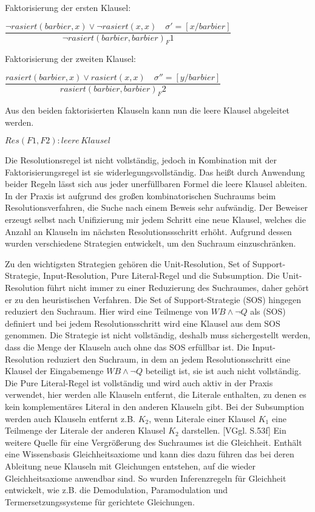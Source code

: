 Faktorisierung der ersten Klausel:\\
\begin{center}
$
\dfrac{\neg rasiert(barbier, x) \vee \neg rasiert(x, x) \quad \sigma' = [x/barbier]}{\neg rasiert(barbier, barbier)_F1}
$
\end{center}
Faktorisierung der zweiten Klausel:\\
\begin{center}
$
\dfrac{rasiert(barbier, x) \vee rasiert(x, x) \quad \sigma'' = [y/barbier]}{ rasiert(barbier, barbier)_F2}
$
\end{center}

Aus den beiden faktorisierten Klauseln kann nun die leere Klausel abgeleitet werden.
\begin{center}
$
Res(F1,F2) : leere\, Klausel
$
\end{center}
\cite[vgl. S.52]{GrundkursKI}

Die Resolutionsregel ist nicht vollständig, jedoch in Kombination mit der Faktorisierungsregel ist sie widerlegungsvollständig. Das heißt durch Anwendung beider Regeln lässt sich aus jeder unerfüllbaren Formel die leere Klausel ableiten.\cite[vgl. S.53 Satz 3.6]{GrundkursKI}\\

In der Praxis ist aufgrund des großen kombinatorischen Suchraums beim Resolutionsverfahren, die Suche nach einem Beweis sehr aufwändig. Der Beweiser erzeugt selbst nach Unifizierung mir jedem Schritt eine neue Klausel, welches die Anzahl an Klauseln im nächsten Resolutionssschritt erhöht. Aufgrund dessen wurden verschiedene Strategien entwickelt, um den Suchraum einzuschränken.

Zu den wichtigsten Strategien gehören die Unit-Resolution, Set of Support-Strategie, Input-Resolution, Pure Literal-Regel und die Subsumption. Die Unit-Resolution führt nicht immer zu einer Reduzierung des Suchraumes, daher gehört er zu den heuristischen Verfahren. Die Set of Support-Strategie (SOS) hingegen reduziert den Suchraum. Hier wird eine Teilmenge von $WB \wedge \neg Q$ als (SOS) definiert und bei jedem Resolutionsschritt wird eine Klausel aus dem SOS genommen. Die Strategie ist nicht vollständig, deshalb muss sichergestellt werden, dass die Menge der Klauseln auch ohne das SOS erfüllbar ist. Die Input-Resolution reduziert den Suchraum, in dem an jedem Resolutionsschritt eine Klausel der Eingabemenge $WB \wedge \neg Q$ beteiligt ist, sie ist auch nicht vollständig. Die Pure Literal-Regel ist vollständig und wird auch aktiv in der Praxis verwendet, hier werden alle Klauseln entfernt, die Literale enthalten, zu denen es kein komplementäres Literal in den anderen Klauseln gibt. Bei der Subsumption werden auch Klauseln entfernt z.B. $K_2$, wenn Literale einer Klausel $K_1$ eine Teilmenge der Literale der anderen Klausel $K_2$ darstellen. [VGgl. S.53f] 
Ein weitere Quelle für eine Vergrößerung des Suchraumes ist die Gleichheit. Enthält eine Wissensbasis Gleichheitsaxiome und kann dies dazu führen das bei deren Ableitung neue Klauseln mit Gleichungen entstehen, auf die wieder Gleichheitsaxiome anwendbar sind. So wurden Inferenzregeln für Gleichheit entwickelt, wie z.B. die Demodulation, Paramodulation und Termersetzungssysteme für gerichtete Gleichungen.\cite[vgl. S.54]{GrundkursKI}

